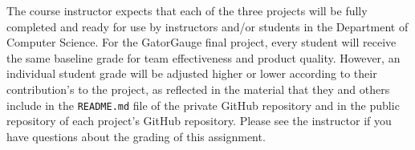 \documentclass[11pt]{article}
\newcommand{\reflection}{\lstinline{README.md}}
\begin{document}
The course instructor expects that each of the three projects will be fully completed and ready for use by instructors
and/or students in the Department of Computer Science. For the GatorGauge final project, every student will receive the
same baseline grade for team effectiveness and product quality. However, an individual student grade will be adjusted
higher or lower according to their contribution's to the project, as reflected in the material that they and others
include in the \reflection{} file of the private GitHub repository and in the public repository of each project's GitHub
repository. Please see the instructor if you have questions about the grading of this assignment.
\end{document}
